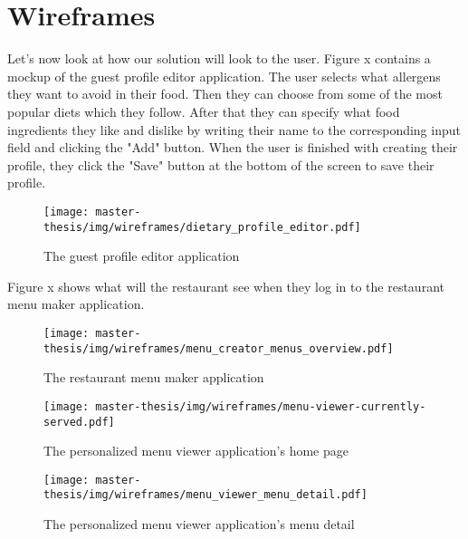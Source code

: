 \section{Wireframes}
Let's now look at how our solution will look to the user.
Figure x contains a mockup of the guest profile editor application.
The user selects what allergens they want to avoid in their food.
Then they can choose from some of the most popular diets which they follow.
After that they can specify what food ingredients they like and dislike by writing their name to the corresponding input field and clicking the "Add" button.
When the user is finished with creating their profile, they click the "Save" button at the bottom of the screen to save their profile.

\begin{figure}[h]
  \centering
  \texttt{[image: master-thesis/img/wireframes/dietary\_profile\_editor.pdf]}
  \caption{The guest profile editor application}
\end{figure}

Figure x shows what will the restaurant see when they log in to the restaurant menu maker application.


\begin{figure}[h]
  \centering
  \texttt{[image: master-thesis/img/wireframes/menu\_creator\_menus\_overview.pdf]}
  \caption{The restaurant menu maker application}
\end{figure}

\begin{figure}[h]
  \centering
  \texttt{[image: master-thesis/img/wireframes/menu-viewer-currently-served.pdf]}
  \caption{The personalized menu viewer application's home page}
\end{figure}

\begin{figure}[h]
  \centering
  \texttt{[image: master-thesis/img/wireframes/menu\_viewer\_menu\_detail.pdf]}
  \caption{The personalized menu viewer application's menu detail}
\end{figure}

